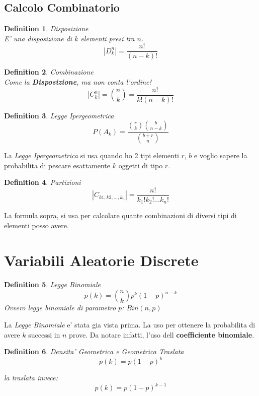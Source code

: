 \documentclass{article}
\newtheorem{definition}{Definition}[section]
\begin{document}
    \subsection{Calcolo Combinatorio}
    \begin{definition} Disposizione \\
        E' una disposizione di $k$ elementi presi tra $n$.
        $$|D_k ^n| = \frac{n!}{(n-k)!}$$
    \end{definition}

    \begin{definition} Combinazione \\
        Come la \textbf{Disposizione}, ma non conta l'ordine!
        $$|C_k ^n| = \binom{n}{k} = \frac{n!}{k!(n-k)!}$$
    \end{definition}

    \begin{definition} Legge Ipergeometrica
        $$
        P(A_k) = \frac{\binom{r}{k} \binom{b}{n-k}}{\binom{b+r}{n}}
        $$
    \end{definition}

    La \textit{Legge Ipergeometrica} si usa quando ho 2 tipi elementi $r$, $b$ e voglio sapere 
    la probabilita di pescare esattamente $k$ oggetti di tipo $r$.
    \newpage

    \begin{definition} Partizioni \\
        $$ |C_{k1,k2,\dots,k_n}| = \frac{n!}{k_1!k_2! \dots k_n!} $$
    \end{definition}  

    La formula sopra, si usa per calcolare quante combinazioni di diversi tipi di elementi posso avere.

    \newpage
    \section{Variabili Aleatorie Discrete}
    \begin{definition} Legge Binomiale \\
        $$
        p(k) = \binom{n}{k}p^k (1-p)^{n-k}
        $$
        Ovvero legge binomiale di parametro $p$: $Bin(n,p)$
    \end{definition}

    La \textit{Legge Binomiale} e' stata gia vista prima. La uso per ottenere la probabilita
    di avere $k$ successi in $n$ prove. Da notare infatti, l'uso dell \textbf{coefficiente binomiale}.

    \begin{definition} Densita' Geometrica e Geometrica Traslata \\
        $$
        p(k) = p(1-p)^k
        $$

        la traslata invece:
        $$
        p(k) = p(1-p)^{k-1}
        $$
    \end{definition}
\end{document}
